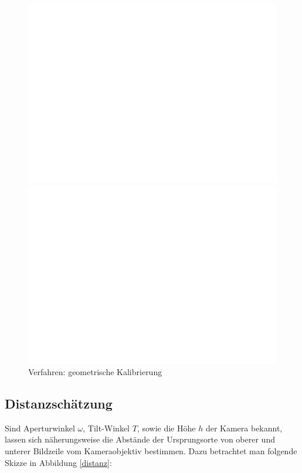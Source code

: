 \begin{figure}[H]
\centering
  \begin{minipage}{0.45\textwidth}
    \includegraphics[width=\textwidth]{images/dummy.png}
  \end{minipage}
  \begin{minipage}{0.45\textwidth}
    \includegraphics[width=\textwidth]{images/dummy.png}
  \end{minipage}
\caption{Verfahren: geometrische Kalibrierung}
\label{geokal}
\end{figure}


\subsection{Distanzschätzung}
Sind Aperturwinkel $\omega$, Tilt-Winkel $T$, sowie die Höhe $h$ der Kamera bekannt, lassen sich näherungsweise die Abstände der Ursprungsorte von oberer und unterer Bildzeile vom Kameraobjektiv bestimmen. Dazu betrachtet man folgende Skizze in Abbildung \ref{distanz}:


